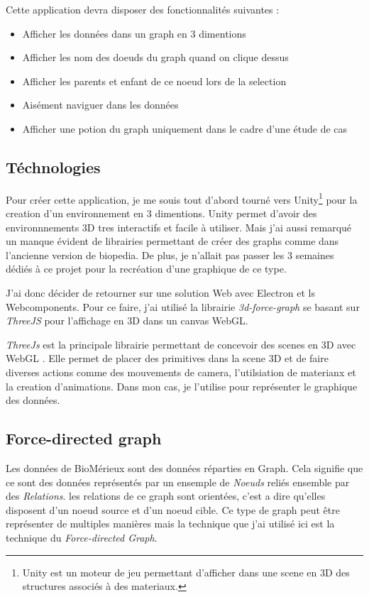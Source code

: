 Cette application devra disposer des fonctionnalités suivantes :

\begin{itemize}
    \item Afficher les données dans un graph en 3 dimentions
    \item Afficher les nom des doeuds du graph quand on clique dessus
    \item Afficher les parents et enfant de ce noeud lors de la selection
    \item Aisément naviguer dans les données
    \item Afficher une potion du graph uniquement dans le cadre d'une étude de cas
\end{itemize}

\subsection{Téchnologies}
\label{biomerieuxBiopediaTéchnologies}

Pour créer cette application, je me souis tout d'abord tourné vers Unity\footnote{Unity est un moteur de jeu permettant d'afficher dans une scene en 3D des structures associés à des materiaux.} pour la creation d'un environnement en 3 dimentions.
Unity permet d'avoir des environnnements 3D tres interactifs et facile à utiliser.
Mais j'ai aussi remarqué un manque évident de librairies permettant de créer des graphs comme dans l'ancienne version de biopedia.
De plus, je n'allait pas passer les 3 semaines dédiés à ce projet pour la recréation d'une graphique de ce type.

J'ai donc décider de retourner sur une solution Web avec Electron et ls Webcomponents.
Pour ce faire, j'ai utilisé la librairie \emph{3d-force-graph} se basant sur \emph{ThreeJS} pour l'affichage en 3D dans un canvas WebGL.

\emph{ThreeJs} est la principale librairie permettant de concevoir des scenes en 3D avec WebGL .
Elle permet de placer des primitives dans la scene 3D et de faire diverses actions comme des mouvements de camera, l'utilsiation de materianx et la creation d'animations.
Dans mon cas, je l'utilise pour représenter le graphique des données.

\subsection{Force-directed graph}
\label{biomerieuxBiopediaForceDirectedGraph}

Les données de BioMérieux sont des données réparties en Graph.
Cela signifie que ce sont des données représentés par un ensemple de \emph{Noeuds} reliés ensemble par des \emph{Relations}.
les relations de ce graph sont orientées, c'est a dire qu'elles disposent d'un noeud source et d'un noeud cible.
Ce type de graph peut être représenter de multiples manières mais la technique que j'ai utilisé ici est la technique du \emph{Force-directed Graph}.

